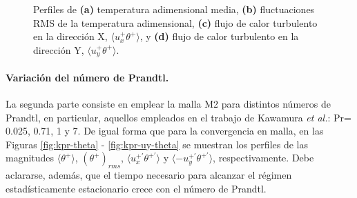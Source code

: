 \begin{figure}[H]
 \caption{Perfiles de \textbf{(a)} temperatura adimensional media, \textbf{(b)} fluctuaciones RMS de la temperatura adimensional, \textbf{(c)} flujo de calor turbulento en la dirección X, $\langle u^+_x \theta^+ \rangle$, y \textbf{(d)} flujo de calor turbulento en la dirección Y, $\langle u^+_y \theta^+ \rangle$.} 
 \label{fig:kmesh_1}
\end{figure}

\paragraph{Variación del número de Prandtl.}
La segunda parte consiste en emplear la malla M2 para distintos números de Prandtl, en particular, aquellos empleados en el trabajo de Kawamura \textit{et al.}: Pr= 0.025, 0.71, 1 y 7. De igual forma que para la convergencia en malla, en las Figuras \ref{fig:kpr-theta} - \ref{fig:kpr-uy-theta} se muestran los perfiles de las magnitudes $\langle \theta^+ \rangle$, $(\theta^+)_{rms}$, $\langle u^{+ \prime}_x \theta^{+ \prime} \rangle$ y $\langle - u^{+ \prime}_y \theta^{+ \prime} \rangle$, respectivamente. Debe aclararse, además, que el tiempo necesario para alcanzar el régimen estadísticamente estacionario crece con el número de Prandtl.

